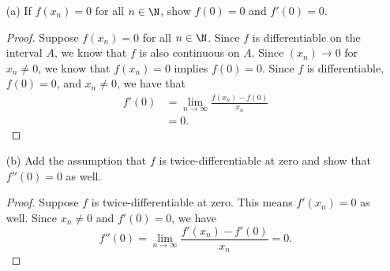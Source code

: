 \begin{enumerate}
    \item[(a)] If \( f(x_n) = 0  \) for all \( n \in \N  \), show \( f(0) = 0  \) and \( f'(0) = 0  \). 
        \begin{proof}
            Suppose \( f(x_n) = 0  \) for all \( n \in \N  \). Since \( f  \) is differentiable on the interval \( A  \), we know that \( f  \) is also continuous on \( A  \). Since \( (x_n) \to 0  \) for \( x_n \neq 0  \), we know that \( f(x_n) = 0  \) implies \( f(0) = 0  \). Since \( f  \) is differentiable, \( f(0) = 0  \), and \( x_n \neq 0  \), we have that
            \begin{align*}
                f'(0) &= \lim_{ n \to \infty  } \frac{ f(x_n) - f(0)  }{ x_n  }  \\
                      &= 0. 
            \end{align*}
        \end{proof}
    \item[(b)] Add the assumption that \( f  \) is twice-differentiable at zero and show that \( f''(0) = 0  \) as well.
        \begin{proof}
        Suppose \( f  \) is twice-differentiable at zero. This means \( f'(x_n) = 0  \) as well. Since \( x_n \neq 0  \) and \( f'(0) = 0  \), we have
        \[  f''(0) = \lim_{n  \to \infty  } \frac{ f'(x_n) - f'(0) }{ x_n } = 0.   \]
        \end{proof}
\end{enumerate}

